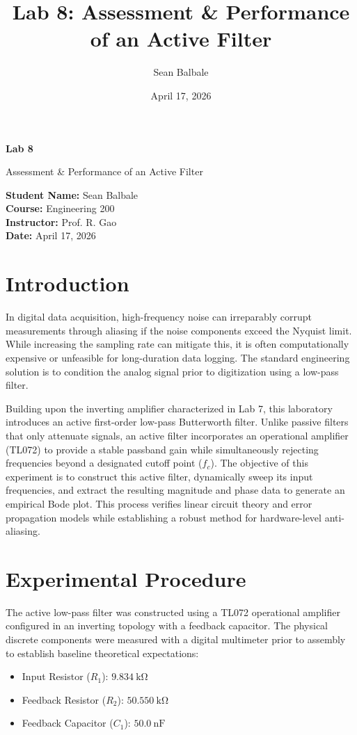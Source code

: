 \documentclass[11pt]{article}
\title{\textbf{Lab 8: Assessment \& Performance of an Active Filter}}
\author{Sean Balbale}
\date{April 17, 2026}
\begin{document}
\begin{titlepage}
  \begin{center}
    \vspace*{1in}

    \Huge
    \textbf{Lab 8}

    \LARGE
    Assessment \& Performance of an Active Filter

    \vspace{3in}

    \textbf{Student Name:} Sean Balbale
    \\ \textbf{Course:} Engineering 200
    \\ \textbf{Instructor:} Prof. R. Gao
    \\ \textbf{Date:} April 17, 2026

    \vfill

  \end{center}
\end{titlepage}

\newpage

\section{Introduction}
In digital data acquisition, high-frequency noise can irreparably corrupt measurements through aliasing if the noise components exceed the Nyquist limit. While increasing the sampling rate can mitigate this, it is often computationally expensive or unfeasible for long-duration data logging. The standard engineering solution is to condition the analog signal prior to digitization using a low-pass filter. 

Building upon the inverting amplifier characterized in Lab 7, this laboratory introduces an active first-order low-pass Butterworth filter. Unlike passive filters that only attenuate signals, an active filter incorporates an operational amplifier (TL072) to provide a stable passband gain while simultaneously rejecting frequencies beyond a designated cutoff point ($f_c$). The objective of this experiment is to construct this active filter, dynamically sweep its input frequencies, and extract the resulting magnitude and phase data to generate an empirical Bode plot. This process verifies linear circuit theory and error propagation models while establishing a robust method for hardware-level anti-aliasing.

\section{Experimental Procedure}
The active low-pass filter was constructed using a TL072 operational amplifier configured in an inverting topology with a feedback capacitor. The physical discrete components were measured with a digital multimeter prior to assembly to establish baseline theoretical expectations:
\begin{itemize}
    \item Input Resistor ($R_1$): $\SI{9.834}{\kilo\ohm}$
    \item Feedback Resistor ($R_2$): $\SI{50.550}{\kilo\ohm}$
    \item Feedback Capacitor ($C_1$): $\SI{50.0}{\nano\farad}$
\end{itemize}
\end{document}
